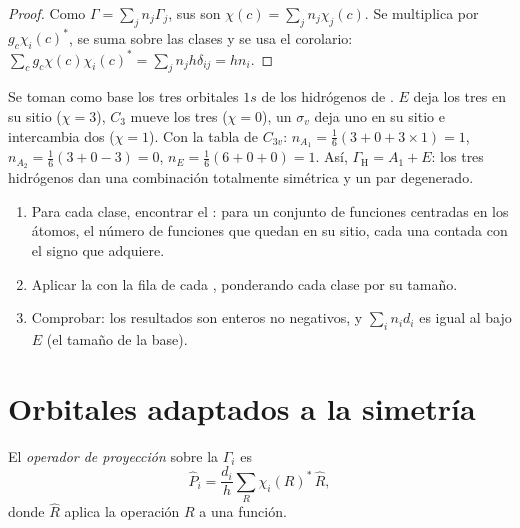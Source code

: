 \begin{proof}
Como $\Gamma = \sum_jn_j\Gamma_j$, sus  son $\chi(c) = \sum_jn_j\chi_j(c)$.
Se multiplica por $g_c\chi_i(c)^*$, se suma sobre las clases y se usa el corolario:
$\sum_cg_c\chi(c)\chi_i(c)^* = \sum_jn_jh\delta_{ij} = hn_i$.
\end{proof}

\begin{example}\label{ex:b3:group-theory-applied:nh3}
Se toman como base los tres orbitales $1s$ de los hidrógenos de . $E$
deja los tres en su sitio ($\chi = 3$), $C_3$ mueve los tres ($\chi = 0$), un
$\sigma_v$ deja uno en su sitio e intercambia dos ($\chi = 1$). Con la tabla de $C_{3v}$:
$n_{A_1} = \frac16(3 + 0 + 3\times1) = 1$, $n_{A_2} = \frac16(3 + 0 - 3) = 0$,
$n_E = \frac16(6 + 0 + 0) = 1$. Así, $\Gamma_{\mathrm H} = A_1 + E$: los tres
hidrógenos dan una combinación totalmente simétrica y un par degenerado.
\end{example}

\begin{method}\label{met:b3:group-theory-applied:reduce}
\begin{enumerate}
  \item Para cada clase, encontrar el : para un conjunto de funciones centradas en los
        átomos, el número de funciones que quedan en su sitio, cada una contada con
        el signo que adquiere.
  \item Aplicar la  con la fila de cada , ponderando cada clase por su tamaño.
  \item Comprobar: los resultados son enteros no negativos, y $\sum_in_id_i$
        es igual al  bajo $E$ (el tamaño de la base).
\end{enumerate}
\end{method}

\section{Orbitales adaptados a la simetría}

\begin{definition}\label{def:b3:group-theory-applied:projection}
El \emph{operador de proyección} sobre la
 $\Gamma_i$ es
\[
\hat P_i = \frac{d_i}{h}\sum_R\chi_i(R)^*\,\hat R,
\]
donde $\hat R$ aplica la operación $R$ a una función.
\end{definition}

